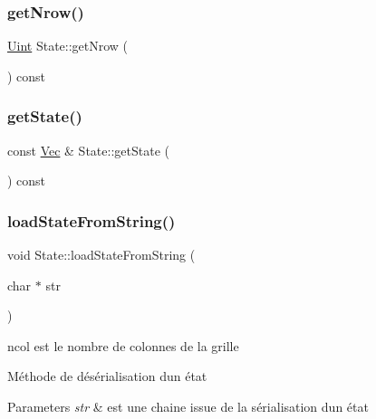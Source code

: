 \mbox{\label{class_state_a7897325c49eb83639365bc61d806fab2}} 
\subsubsection{\texorpdfstring{get\+Nrow()}{getNrow()}}
{\footnotesize\ttfamily \mbox{\hyperlink{state_8h_a4840c4503b7d10cea5e08416eb3716f1}{Uint}} State\+::get\+Nrow (\begin{DoxyParamCaption}{ }\end{DoxyParamCaption}) const}

\mbox{\label{class_state_aa2168c5a262b6bce4cbadc069d72d1be}} 
\subsubsection{\texorpdfstring{get\+State()}{getState()}}
{\footnotesize\ttfamily const \mbox{\hyperlink{state_8h_aa074fbe250e9d18fbe221bb7473158ad}{Vec}} \& State\+::get\+State (\begin{DoxyParamCaption}{ }\end{DoxyParamCaption}) const}

\mbox{\label{class_state_a34eca90486ef2fa8516d255279ce394f}} 
\subsubsection{\texorpdfstring{load\+State\+From\+String()}{loadStateFromString()}}
{\footnotesize\ttfamily void State\+::load\+State\+From\+String (\begin{DoxyParamCaption}\item[{char $\ast$}]{str }\end{DoxyParamCaption})\hspace{0.3cm}{\ttfamily [private]}}



ncol est le nombre de colonnes de la grille 

Méthode de désérialisation d\textquotesingle{}un état 
\begin{DoxyParams}{Parameters}
{\em str} & est une chaine issue de la sérialisation d\textquotesingle{}un état \\
\hline
\end{DoxyParams}
\mbox{\label{class_state_ae51e526916dea6aa33f0dbd4529f877b}} 
